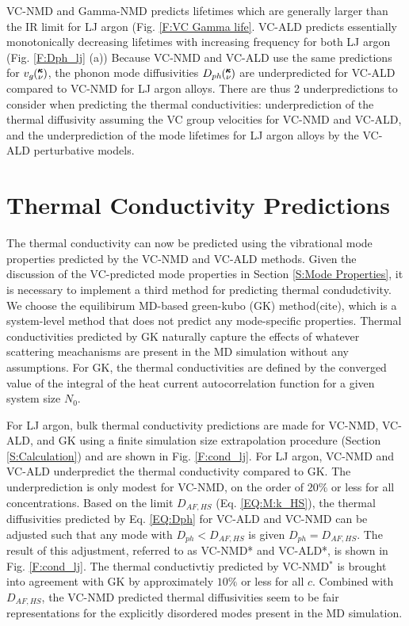 \documentclass[aps,prb,onecolumn,preprint,superscriptaddress,amsmath,amssymb,floatfix]{revtex4}
\newcommand{\kv}{\mspace{-4.0mu}\left(\mspace{-8.0mu}
\begin{smallmatrix}&\pmb{\kappa} \\&\nu\end{smallmatrix}
\mspace{-3.0mu}\right)}
\begin{document}
VC-NMD and Gamma-NMD predicts lifetimes which 
are generally larger than the IR limit  
for LJ argon (Fig. \ref{F:VC Gamma life}.   
VC-ALD predicts essentially monotonically 
decreasing lifetimes with increasing frequency for both LJ argon 
(Fig. \ref{F:Dph_lj} (a)) 
Because VC-NMD and VC-ALD 
use the same predictions for $v_g\kv$, the phonon mode 
diffusivities $D_{ph}\kv$ are underpredicted for 
VC-ALD compared to VC-NMD for LJ argon alloys. 
There are thus 2 underpredictions to consider 
when predicting the thermal conductivities: 
underprediction 
of the thermal diffusivity assuming the VC group velocities for 
VC-NMD and VC-ALD, and the underprediction of the mode lifetimes for 
LJ argon alloys by 
the VC-ALD perturbative models. 

\section{\label{S:Thermal Conductivity}Thermal Conductivity Predictions}

The thermal conductivity can now be predicted using the 
vibrational mode properties 
predicted by the VC-NMD and VC-ALD 
methods.  Given the discussion of the VC-predicted mode properties 
in Section \ref{S:Mode Properties}, 
it is necessary to implement a third method 
for predicting thermal condudctivity. 
We choose the equilibirum MD-based green-kubo (GK) method(cite), which 
is a system-level method that 
does not predict any mode-specific properties. 
Thermal conductivities predicted by GK 
naturally capture the effects of whatever scattering 
meachanisms are 
present in the MD simulation without any assumptions.
\cite{skye_thermal_2008,landry_complex_2008,landry_effect_2009} 
For GK, the thermal conductivities are defined by the converged value of 
the integral of the heat current autocorrelation function for a given 
system size $N_0$. 

For LJ argon, bulk thermal conductivity predictions are made for 
VC-NMD, VC-ALD, and GK using a finite simulation size extrapolation 
procedure (Section \ref{S:Calculation}) 
and are shown in Fig. \ref{F:cond_lj}. 
For LJ argon, VC-NMD and VC-ALD underpredict the thermal 
conductivity compared to GK. 
The underprediction is only modest for VC-NMD, on the order of 
$20\%$ or less for all concentrations. 
Based on the limit $D_{AF,HS}$ (Eq. \eqref{EQ:M:k_HS}), the 
thermal diffusivities predicted by Eq. \eqref{EQ:Dph} for VC-ALD 
and VC-NMD can be adjusted such that any mode with 
$D_{ph} < D_{AF,HS}$ is given $D_{ph} = D_{AF,HS}$. 
The result of this adjustment, 
referred to as VC-NMD* and VC-ALD*, is shown in Fig. \ref{F:cond_lj}. 
The thermal conductivtiy predicted by VC-NMD$^*$ is 
brought 
into agreement with GK by approximately $10\%$ or less for all $c$. 
Combined with $D_{AF,HS}$, the VC-NMD predicted thermal 
diffusivities seem to be fair representations for the explicitly 
disordered modes present in the MD simulation.
\end{document}
